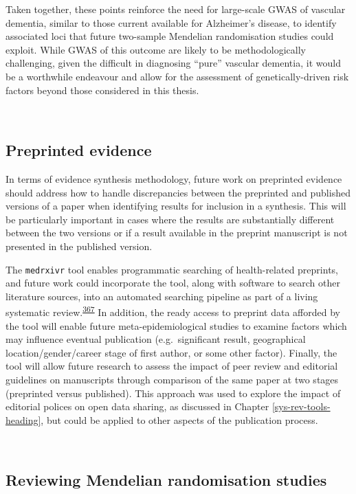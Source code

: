 \documentclass[a4paper, twoside]{templates/ociamthesis}
\begin{document}
Taken together, these points reinforce the need for large-scale GWAS of vascular dementia, similar to those current available for Alzheimer's disease, to identify associated loci that future two-sample Mendelian randomisation studies could exploit. While GWAS of this outcome are likely to be methodologically challenging, given the difficult in diagnosing ``pure'' vascular dementia, it would be a worthwhile endeavour and allow for the assessment of genetically-driven risk factors beyond those considered in this thesis.

~

\hypertarget{preprinted-evidence}{%
\subsection{Preprinted evidence}\label{preprinted-evidence}}

In terms of evidence synthesis methodology, future work on preprinted evidence should address how to handle discrepancies between the preprinted and published versions of a paper when identifying results for inclusion in a synthesis. This will be particularly important in cases where the results are substantially different between the two versions or if a result available in the preprint manuscript is not presented in the published version.

The \texttt{medrxivr} tool enables programmatic searching of health-related preprints, and future work could incorporate the tool, along with software to search other literature sources, into an automated searching pipeline as part of a living systematic review.\textsuperscript{\protect\hyperlink{ref-elliott2014}{367}} In addition, the ready access to preprint data afforded by the tool will enable future meta-epidemiological studies to examine factors which may influence eventual publication (e.g.~significant result, geographical location/gender/career stage of first author, or some other factor). Finally, the tool will allow future research to assess the impact of peer review and editorial guidelines on manuscripts through comparison of the same paper at two stages (preprinted versus published). This approach was used to explore the impact of editorial polices on open data sharing, as discussed in Chapter \ref{sys-rev-tools-heading}, but could be applied to other aspects of the publication process.

~

\hypertarget{reviewing-mendelian-randomisation-studies}{%
\subsection{Reviewing Mendelian randomisation studies}\label{reviewing-mendelian-randomisation-studies}}
\end{document}
